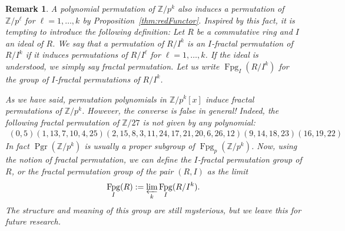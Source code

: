 \documentclass[oneside]{amsart}
\theoremstyle{nthm}
\theoremstyle{ndef}
\theoremstyle{nrem}
\newtheorem{rem}[subsection]{Remark}
\newcommand{\Z}{\mathbb{Z}}
\newcommand{\df}[1]{#1}
\DeclareMathOperator{\Pgr}{Pgr}
\DeclareMathOperator{\Fpg}{Fpg}
\newcommand{\permterm}{fractal }
\begin{document}
\begin{rem}A polynomial permutation of $\Z/p^k$ also induces a permutation of $\Z/p^\ell$ for $\ell=1,\dots,k$ by Proposition~\ref{thm:redFunctor}. Inspired by this fact, it is tempting to introduce the following definition: Let $R$ be a commutative ring and $I$ an ideal of $R$. We say that a permutation of $R/I^k$ is an \df{$I$-\permterm permutation} of $R/I^k$ if it induces permutations of $R/I^\ell$ for $\ell=1,\dots,k$. If the ideal is understood, we simply say \df{\permterm permutation}. Let us write $\Fpg_I(R/I^k)$ for the group of $I$-fractal permutations of $R/I^k$. 
    
    As we have said, permutation polynomials in $\Z/p^k[x]$ induce \permterm permutations of $\Z/p^k$. However, the converse is false in general! Indeed, the following fractal permutation of $\Z/27$ is not given by any polynomial:
\begin{align*}
    (0,5)(1,13,7,10,4,25)(2,15,8,3,11,24,17,21,20,6,26,12)(9,14,18,23)(16,19,22)
\end{align*}
In fact $\Pgr(\Z/p^k)$ is usually a proper subgroup of $\Fpg_p(\Z/p^k)$. Now, using the notion of fractal permutation, we can define the $I$-fractal permutation group of $R$, or the fractal permutation group of the pair $(R,I)$ as the limit
\begin{align*}
    \Fpg_I(R) := \varprojlim_k \Fpg_I(R/I^k).
\end{align*}
The structure and meaning of this group are still mysterious, but we leave this for future research.
\end{rem}




\end{document}
